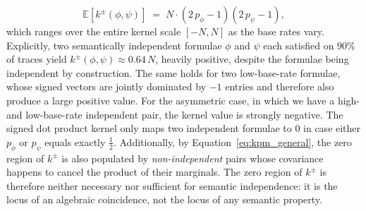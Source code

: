 \documentclass[titlepage,a4paper,11pt]{report}
\begin{document}
    \begin{equation}\label{eq:kpm_indep}
        \mathbb{E}\!\left[k^\pm(\phi, \psi)\right]
        \;=\;
        N \cdot (2\,p_\phi - 1)(2\,p_\psi - 1),
    \end{equation}
    which ranges over the entire kernel scale $[-N, N]$ as the base rates vary. Explicitly, two semantically independent formulae $\phi$ and $\psi$ each satisfied on $90\%$ of traces yield $k^\pm(\phi,\psi) \approx 0.64\,N$, heavily positive, despite the formulae being independent by construction. The same holds for two low-base-rate formulae, whose signed vectors are jointly dominated by $-1$ entries and therefore also produce a large positive value. For the asymmetric case, in which we have a high- and low-base-rate independent pair, the kernel value is strongly negative. The signed dot product kernel only maps two independent formulae to $0$ in case either $p_\phi$ or $p_\psi$ equals exactly $\tfrac{1}{2}$. Additionally, by Equation~\eqref{eq:kpm_general}, the zero region of $k^\pm$ is also populated by \emph{non-independent} pairs whose covariance happens to cancel the product of their marginals. The zero region of $k^\pm$ is therefore neither necessary nor sufficient for semantic independence: it is the locus of an algebraic coincidence, not the locus of any semantic property.

\end{document}
